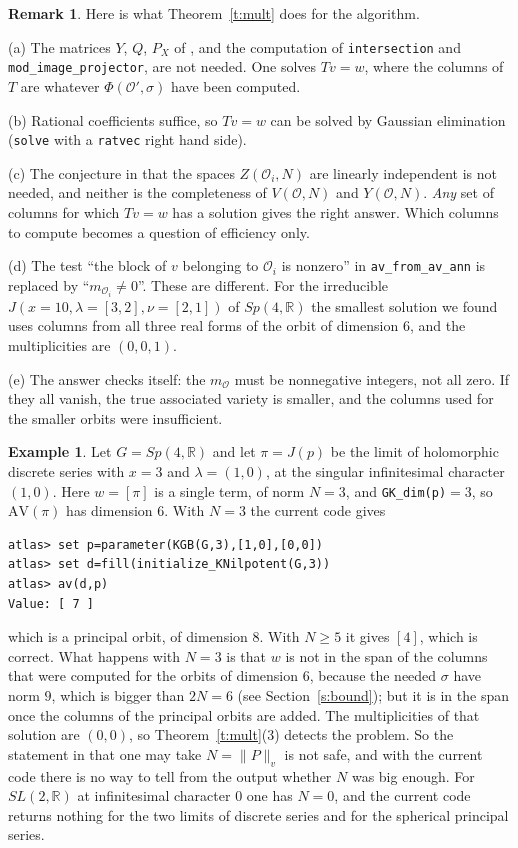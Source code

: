 \documentclass[11pt,leqno]{article}
\theoremstyle{definition}
\newtheorem{remark}[equation]{Remark}
\newtheorem{example}[equation]{Example}
\numberwithin{equation}{section}
\newcommand{\Ob}{\mathcal O}
\newcommand{\R}{\mathbb R}
\newcommand{\AV}{\mathrm{AV}}
\newcommand{\at}[1]{\texttt{#1}}
\begin{document}
\begin{remark}
\label{r:consequences}
Here is what Theorem~\ref{t:mult} does for the algorithm.

\smallskip\noindent
(a) The matrices $Y$, $Q$, $P_X$ of \cite[Section~12]{KN}, and the
computation of \at{intersection} and \at{mod\_image\_projector}, are not
needed.  One solves $Tv=w$, where the columns of $T$ are whatever
$\Phi(\Ob',\sigma)$ have been computed.

\smallskip\noindent
(b) Rational coefficients suffice, so $Tv=w$ can be solved by Gaussian
elimination (\at{solve} with a \at{ratvec} right hand side).

\smallskip\noindent
(c) The conjecture in \cite[Section~11]{KN} that the spaces $Z(\Ob_i,N)$ are
linearly independent is not needed, and neither is the completeness of
$V(\Ob,N)$ and $Y(\Ob,N)$.  \emph{Any} set of columns for which $Tv=w$ has a
solution gives the right answer.  Which columns to compute becomes a question
of efficiency only.

\smallskip\noindent
(d) The test ``the block of $v$ belonging to $\Ob_i$ is nonzero'' in
\at{av\_from\_av\_ann} is replaced by ``$m_{\Ob_i}\ne0$''.  These are different.
For the irreducible $J(x=10,\lambda=[3,2],\nu=[2,1])$ of $Sp(4,\R)$ the
smallest solution we found uses columns from all three real forms of the
orbit of dimension $6$, and the multiplicities are $(0,0,1)$.

\smallskip\noindent
(e) The answer checks itself: the $m_\Ob$ must be nonnegative integers, not
all zero.  If they all vanish, the true associated variety is smaller, and
the columns used for the smaller orbits were insufficient.
\end{remark}

\begin{example}
\label{e:wrong}
Let $G=Sp(4,\R)$ and let $\pi=J(p)$ be the limit of holomorphic discrete
series with $x=3$ and $\lambda=(1,0)$, at the singular infinitesimal character
$(1,0)$.  Here $w=[\pi]$ is a single term, of norm $N=3$, and
\at{GK\_dim(p)}$=3$, so $\AV(\pi)$ has dimension $6$.  With $N=3$ the current
code gives
\begin{verbatim}
atlas> set p=parameter(KGB(G,3),[1,0],[0,0])
atlas> set d=fill(initialize_KNilpotent(G,3))
atlas> av(d,p)
Value: [ 7 ]
\end{verbatim}
which is a principal orbit, of dimension $8$.  With $N\ge 5$ it gives
$[4]$, which is correct.  What happens with $N=3$ is that $w$ is not in the
span of the columns that were computed for the orbits of dimension $6$,
because the needed $\sigma$ have norm $9$, which is bigger than $2N=6$
(see Section~\ref{s:bound}); but it is in the span once the columns of the
principal orbits are added.  The multiplicities
of that solution are $(0,0)$, so Theorem~\ref{t:mult}(3) detects the problem.
So the statement in \cite[Section~10]{KN} that one may take $N=\|P\|_v$ is
not safe, and with the current code there is no way to tell from the output
whether $N$ was big enough.  For $SL(2,\R)$ at infinitesimal character $0$
one has $N=0$, and the current code returns nothing for the two limits of
discrete series and for the spherical principal series.
\end{example}
\end{document}
